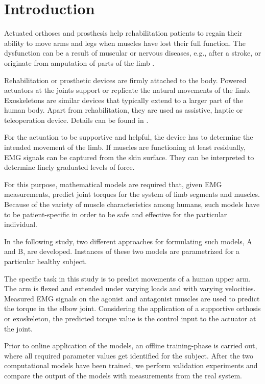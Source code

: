 \section{Introduction}
Actuated orthoses and prosthesis help rehabilitation patients to regain their ability to move arms and legs when muscles have lost their full function. The dysfunction can be a result of muscular or nervous diseases, e.g., after a stroke, or originate from amputation of parts of the limb \cite{Krebs2002, Zhang2018}.

Rehabilitation or prosthetic devices are firmly attached to the body. Powered actuators at the joints support or replicate the natural movements of the limb.
Exoskeletons are similar devices that typically extend to a larger part of the human body. Apart from rehabilitation, they are used as assistive, haptic or teleoperation device. Details can be found in \cite{Perry2007}.

For the actuation to be supportive and helpful, the device has to determine the intended movement of the limb. If muscles are functioning at least residually, EMG signals can be captured from the skin surface. They can be interpreted to determine finely graduated levels of force.

For this purpose, mathematical models are required that, given EMG measurements, predict joint torques for the system of limb segments and muscles. 
Because of the variety of muscle characteristics among humans, such models have to be patient-specific in order to be safe and effective for the particular individual.

In the following study, two different approaches for formulating such models, A and B, are developed. Instances of these two models are parametrized for a particular healthy subject. 

The specific task in this study is to predict movements of a human upper arm. The arm is flexed and extended under varying loads and with varying velocities. Measured EMG signals on the agonist and antagonist muscles are used to predict the torque in the elbow joint. Considering the application of a supportive orthosis or exoskeleton, the predicted torque value is the control input to the actuator at the joint.

Prior to online application of the models, an offline training-phase is carried out, where all required parameter values get identified for the subject. After the two computational models have been trained, we perform validation experiments and compare the output of the models with measurements from the real system.
 
